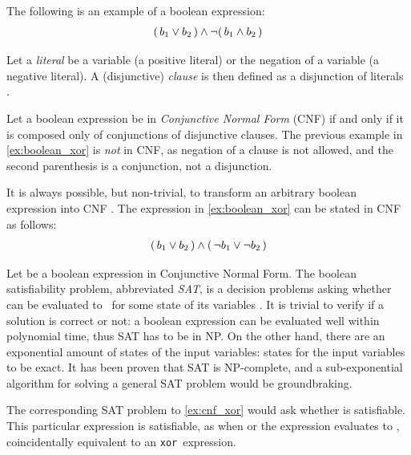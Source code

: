 The following is an example of a boolean expression:
\begin{align}\label{ex:boolean_xor}
	(\, b_1 \lor b_2 \,) \land \neg (\, b_1 \land b_2 \,)
\end{align}

Let a \emph{literal} be a variable  (a positive literal) or the negation of a variable  (a negative literal). A (disjunctive) \emph{clause} is then defined as a disjunction of literals . 

Let a boolean expression be in \emph{Conjunctive Normal Form} (CNF) if and only if it is composed only of conjunctions of disjunctive clauses. The previous example in \cref{ex:boolean_xor} is \emph{not} in CNF, as negation of a clause is not allowed, and the second parenthesis is a conjunction, not a disjunction.

\begin{remark}
	It is always possible, but non-trivial, to transform an arbitrary boolean expression into CNF \cite{?} . The expression in \cref{ex:boolean_xor} can be stated in CNF as follows:
	\begin{align}\label{ex:cnf_xor}
		(\, b_1 \lor b_2 \,) \land (\, \neg b_1 \lor \neg b_2 \,)
	\end{align}
\end{remark}

Let \ilmath{\varphi} be a boolean expression in Conjunctive Normal Form. The boolean satisfiability problem, abbreviated \emph{SAT}, is a decision problems asking whether \ilmath{\varphi} can be evaluated to \true\ for some state of its variables . It is trivial to verify if a solution is correct or not: a boolean expression can be evaluated well within polynomial time, thus SAT has to be in NP. On the other hand, there are an exponential amount of states of the input variables:  states for the  input variables to be exact. It has been proven that SAT is NP-complete, and a sub-exponential algorithm for solving a general SAT problem would be groundbraking. 

The corresponding SAT problem to \cref{ex:cnf_xor} would ask whether \ilmath{\varphi} is satisfiable. This particular expression is satisfiable, as when  or  the expression evaluates to \true, coincidentally equivalent to an \texttt{xor}\ expression.

